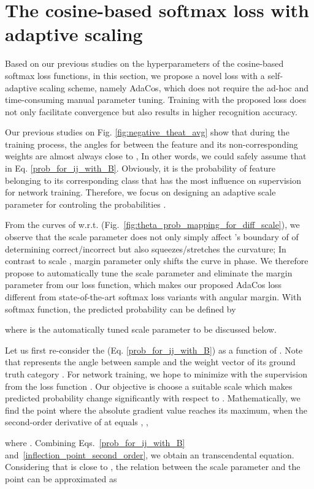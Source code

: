 \documentclass[10pt,twocolumn,letterpaper]{article}
\begin{document}
\section{The cosine-based softmax loss with adaptive scaling}
Based on our previous studies on the hyperparameters of the cosine-based softmax loss functions, in this section, we propose a novel loss with a self-adaptive scaling scheme, namely AdaCos, which does not require the ad-hoc and time-consuming manual parameter tuning. Training with the proposed loss does not only facilitate convergence but also results in higher recognition accuracy.

Our previous studies on Fig. \ref{fig:negative_theat_avg} show that during the training process, the angles  for  between the feature  and its non-corresponding weights  are almost always close to , In other words, we could safely assume that  in Eq. \eqref{prob_for_ij_with_B}. Obviously, it is the probability  of feature  belonging to its corresponding class  that has the most influence on supervision for network training. Therefore, we focus on designing an adaptive scale parameter for controling the probabilities .

From the curves of  w.r.t.  (Fig.~\ref{fig:theta_prob_mapping_for_diff_scale}), we observe that the scale parameter  does not only simply affect 's boundary of of determining correct/incorrect but also squeezes/stretches the  curvature; In contrast to scale , margin parameter  only shifts the curve in phase. 
We therefore propose to automatically tune the scale parameter  and eliminate the margin parameter  from our loss function, which makes our proposed AdaCos loss different from state-of-the-art softmax loss variants with angular margin. With softmax function, the predicted probability can be defined by

where  is the automatically tuned scale parameter to be discussed below.

Let us first re-consider the  (Eq. \eqref{prob_for_ij_with_B}) 
as a function of . Note that  represents the angle between sample  and the weight vector of its ground truth category . For network training, we hope to minimize  with the supervision from the loss function . Our objective is choose a suitable scale  which makes predicted probability  change significantly with respect to . Mathematically, we find the point where the absolute gradient value   reaches its maximum, when the second-order derivative of  at  equals , \ie,

where . Combining Eqs.~\eqref{prob_for_ij_with_B} and~\eqref{inflection_point_second_order}, we obtain an transcendental equation. Considering that  is close to , the relation between the scale parameter  and the point  can be approximated as
\end{document}
